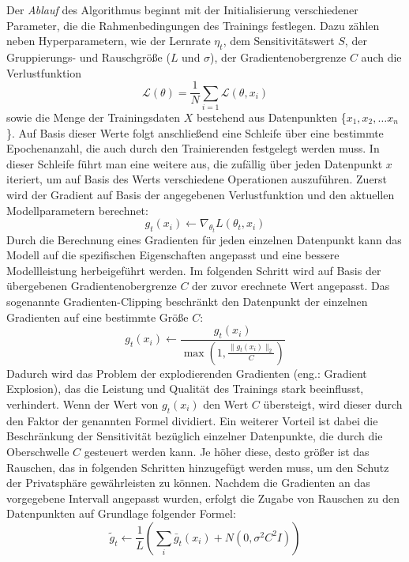 Der \textit{Ablauf} des Algorithmus beginnt mit der Initialisierung verschiedener Parameter, die die Rahmenbedingungen des Trainings festlegen. Dazu zählen neben Hyperparametern, wie der Lernrate $\eta_t$, dem Sensitivitätswert $S$, der Gruppierungs- und Rauschgröße ($L$ und $\sigma$), der Gradientenobergrenze $C$ auch die Verlustfunktion 
\begin{equation}
	\mathcal{L}(\theta) = \frac{1}{N} \sum_{i=1} \mathcal{L}(\theta,x_i)
\end{equation}
sowie die Menge der Trainingsdaten $X$ bestehend aus Datenpunkten \{$x_1, x_2, \dots x_n$\}. Auf Basis dieser Werte folgt anschließend eine Schleife über eine bestimmte Epochenanzahl, die auch durch den Trainierenden festgelegt werden muss. In dieser Schleife führt man eine weitere aus, die zufällig über jeden Datenpunkt $x$ iteriert, um auf Basis des Werts verschiedene Operationen auszuführen. Zuerst wird der Gradient auf Basis der angegebenen Verlustfunktion und den aktuellen Modellparametern berechnet: 
\begin{equation}
	g_t(x_i) \leftarrow \nabla_{\theta_t} L(\theta_t, x_i)
\end{equation}
Durch die Berechnung eines Gradienten für jeden einzelnen Datenpunkt kann das Modell auf die spezifischen Eigenschaften angepasst und eine bessere Modellleistung herbeigeführt werden. Im folgenden Schritt wird auf Basis der übergebenen Gradientenobergrenze $C$ der zuvor erechnete Wert angepasst. Das sogenannte \glqq Gradienten-Clipping\grqq{} beschränkt den Datenpunkt der einzelnen Gradienten auf eine bestimmte Größe $C$: 
\begin{equation} 
	g_t(x_i) \leftarrow \frac{g_t(x_i)}{\max \left(1, \frac{\|g_t(x_i)\|_2}{C}\right)}
\end{equation}
Dadurch wird das Problem der explodierenden Gradienten (eng.: Gradient Explosion), das die Leistung und Qualität des Trainings stark beeinflusst, verhindert. Wenn der Wert von $g_t(x_i)$ den Wert $C$ übersteigt, wird dieser durch den Faktor der genannten Formel dividiert. Ein weiterer Vorteil ist dabei die Beschränkung der Sensitivität bezüglich einzelner Datenpunkte, die durch die Oberschwelle $C$ gesteuert werden kann. Je höher diese, desto größer ist das Rauschen, das in folgenden Schritten hinzugefügt werden muss, um den Schutz der Privatsphäre gewährleisten zu können.
Nachdem die Gradienten an das vorgegebene Intervall angepasst wurden, erfolgt die Zugabe von Rauschen zu den Datenpunkten auf Grundlage folgender Formel:
\begin{equation}
	\tilde{g}_t \leftarrow \frac{1}{L} \left( \sum_i \bar{g}_t(x_i) + N(0, \sigma^2C^2I) \right)
\end{equation}
